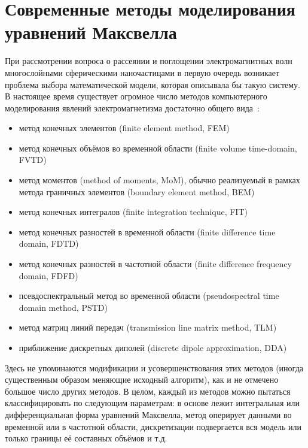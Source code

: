 \section{Современные методы моделирования уравнений Максвелла}
\label{sec:em-methods-intro}
При рассмотрении вопроса о рассеянии и поглощении электромагнитных
волн многослойными сферическими наночастицами в первую очередь
возникает проблема выбора математической модели, которая описывала бы
такую систему.  В настоящее время существует огромное число методов
компьютерного моделирования явлений электромагнетизма достаточно
общего
вида~\cite{Yu-PFDTD-2006,Inan-FDTD-2011,clemson,Bondenson-CEM-2005,Yu-Advanced-FDTD-2011}:
\begin{itemize}
\item метод конечных элементов (finite element method, FEM)
\item метод конечных объёмов во временной области (finite volume
  time-domain, FVTD)
\item метод моментов (method of moments, MoM), обычно реализуемый
  в рамках метода граничных элементов (boundary element method, BEM)
\item метод конечных интегралов (finite integration technique, FIT)
\item метод конечных разностей в временной области (finite difference
  time domain, FDTD)
\item метод конечных разностей в частотной области (finite difference
  frequency domain, FDFD)
\item псевдоспектральный метод во временной области (pseudospectral
  time domain method, PSTD)
\item метод матриц линий передач (transmission line matrix method,
  TLM)
\item приближение дискретных диполей (discrete dipole approximation, DDA)
\end{itemize}
Здесь не упоминаются модификации и усовершенствования этих методов
(иногда существенным образом меняющие исходный алгоритм), как и не
отмечено большое число других методов.  В целом, каждый из методов
можно пытаться классифицировать по следующим параметрам: в основе
лежит интегральная или дифференциальная форма уравнений Максвелла,
метод оперирует данными во временной или в частотной области,
дискретизации подвергается вся модель или только границы её составных
объёмов и т.д.

